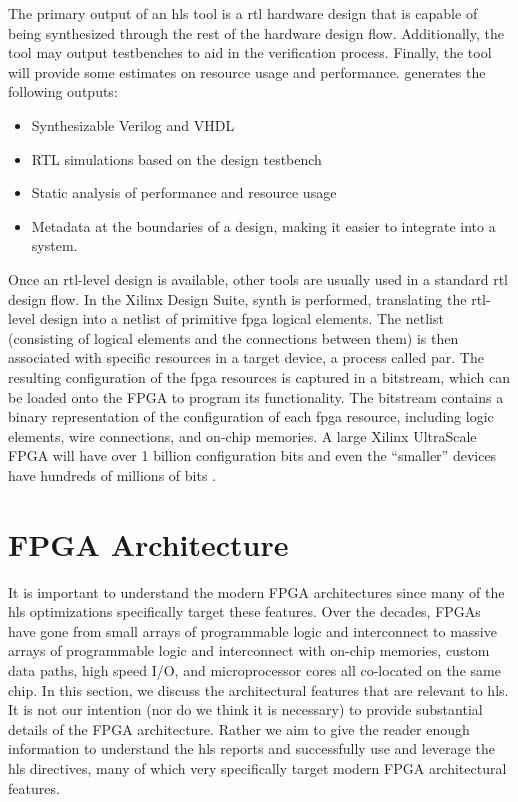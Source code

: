 The primary output of an \gls{hls} tool is a \gls{rtl} hardware design that is capable of being synthesized through the rest of the hardware design flow. Additionally, the tool may output testbenches to aid in the verification process. Finally, the tool will provide some estimates on resource usage and performance.  \VHLS generates the following outputs:
\begin{itemize}
\item Synthesizable Verilog and VHDL
\item RTL simulations based on the design testbench
\item Static analysis of performance and resource usage
\item Metadata at the boundaries of a design, making it easier to integrate into a system.
\end{itemize}

Once an \gls{rtl}-level design is available, other tools are usually used in a standard \gls{rtl} design flow.  In the Xilinx \vivado Design Suite, \gls{synth} is performed, translating the \gls{rtl}-level design into a \gls{netlist} of primitive \gls{fpga} logical elements.  The \gls{netlist} (consisting of logical elements and the connections between them) is then associated with specific resources in a target device, a process called \gls{par}.  The resulting configuration of the \gls{fpga} resources is captured in a \gls{bitstream}, which can be loaded onto the FPGA to program its functionality.  The \gls{bitstream} contains a binary representation of the configuration of each \gls{fpga} resource, including logic elements, wire connections, and on-chip memories. A large Xilinx UltraScale FPGA will have over 1 billion configuration bits and even the ``smaller'' devices have hundreds of millions of bits \cite{ultrascaleArchConfig}. 


\section{FPGA Architecture}

It is important to understand the modern FPGA architectures since many of the \gls{hls} optimizations specifically target these features. Over the decades, FPGAs have gone from small arrays of programmable logic and interconnect to massive arrays of programmable logic and interconnect with on-chip memories, custom data paths, high speed I/O, and microprocessor cores all co-located on the same chip. In this section, we discuss the  architectural features that are relevant to \gls{hls}. It is not our intention (nor do we think it is necessary) to provide substantial details of the FPGA architecture. Rather we aim to give the reader enough information to understand the \gls{hls} reports and successfully use and leverage the \gls{hls} directives, many of which very specifically target modern FPGA architectural features.

